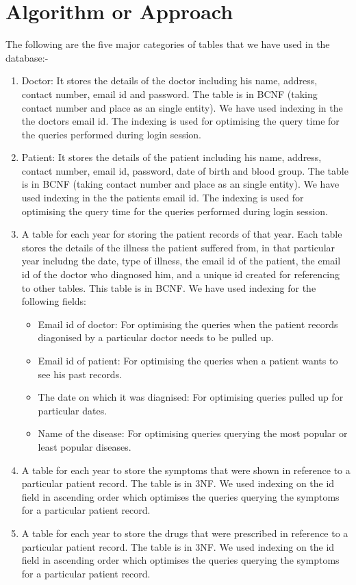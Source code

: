 \documentclass{article}
\begin{document}
\newpage
\section{Algorithm or Approach}

The following are the five major categories of tables that we have used in the database:-

\begin{enumerate}
\item Doctor: It stores the details of the doctor including his name, address, contact number, email id and password. The table is in BCNF (taking contact number and place as an single entity). We have used indexing in the the doctors email id. The indexing is used for optimising the query time for the queries performed during login session.
\item Patient: It stores the details of the patient including his name, address, contact number, email id, password, date of birth and blood group. The table is in BCNF (taking contact number and place as an single entity). We have used indexing in the the patients email id. The indexing is used for optimising the query time for the queries performed during login session.
\item A table for each year for storing the patient records of that year. Each table stores the details of the illness the patient suffered from, in that particular year includng the date, type of illness, the email id of the patient, the email id of the doctor who diagnosed him, and a unique id created for referencing to other tables. This table is in BCNF. We have used indexing for the following fields:
\begin{itemize} 
\item Email id of doctor: For optimising the queries when the patient records diagonised by a particular doctor needs to be pulled up.
\item Email id of patient: For optimising the queries when a patient wants to see his past records.
\item The date on which it was diagnised: For optimising queries pulled up for particular dates.
\item Name of the disease: For optimising queries querying the most popular or least popular diseases.
\end{itemize}
\item A table for each year to store the symptoms that were shown in reference to a particular patient record. The table is in 3NF. We used indexing on the id field in ascending order which optimises the queries querying the symptoms for a particular patient record.
\item A table for each year to store the drugs that were prescribed in reference to a particular patient record. The table is in 3NF. We used indexing on the id field in ascending order which optimises the queries querying the symptoms for a particular patient record.
\end{enumerate}
\end{document}
